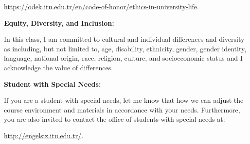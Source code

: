 \documentclass[
  12pt,
]{article}
\begin{document}
\url{https://odek.itu.edu.tr/en/code-of-honor/ethics-in-university-life}.

\textbf{Equity, Diversity, and Inclusion:}

In this class, I am committed to cultural and individual differences and
diversity as including, but not limited to, age, disability, ethnicity,
gender, gender identity, language, national origin, race, religion,
culture, and socioeconomic status and I acknowledge the value of
differences.

\textbf{Student with Special Needs:}

If you are a student with special needs, let me know that how we can
adjust the course environment and materials in accordance with your
needs. Furthermore, you are also invited to contact the office of
students with special needs at:

\url{http://engelsiz.itu.edu.tr/}.
\end{document}
